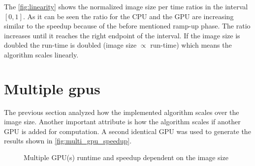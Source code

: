 The \autoref{fig:linearity} shows the normalized image size per time ratios in
the interval $[0,1]$. As it can be seen the ratio for the \gls{CPU} and the
\gls{GPU} are increasing similar to the speedup because of the before mentioned
ramp-up phase. The ratio increases until it reaches the right endpoint of the
interval. If the image size is doubled the run-time is doubled (image size
$\propto$ run-time) which means the algorithm scales linearly.


\section{Multiple gpus} %
\label{sec:multiple_gpus}
The previous section analyzed how the implemented algorithm scales over the
image size. Another important attribute is how the algorithm scales if another
\gls{GPU} is added for computation. A second identical \gls{GPU} was used to
generate the results shown in \autoref{fig:multi_gpu_speedup}.

\begin{figure}[ht]
  \centering
  \caption{Multiple GPU(s) runtime and speedup dependent on the image size}%
	\label{fig:multi_gpu_speedup}%
\end{figure}

